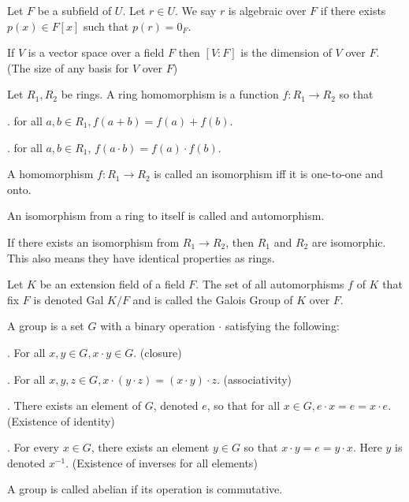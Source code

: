 \documentclass{article}
\newcommand\inv{^{-1}}
\begin{document}
Let $F$ be a subfield of $U$. Let $r\in U$. We say $r$ is algebraic over $F$ if there exists $p(x)\in F[x]$ such that $p(r)=0_F$.

\noindent{\bf $[V:F]$}

If $V$ is a vector space over a field $F$ then $[V:F]$ is the dimension of $V$ over $F$. (The size of any basis for $V$ over $F$)


Let $R_1, R_2$ be rings. A ring homomorphism is a function $f:R_1\to R_2$ so that

\indent{}. for all $a,b\in R_1, f(a+b)=f(a)+f(b)$.

\indent{}. for all $a,b\in R_1$, $f(a\cdot b) = f(a)\cdot f(b)$.


A homomorphism $f:R_1 \to R_2$ is called an isomorphism iff it is one-to-one and onto.


An isomorphism from a ring to itself is called and automorphism.


If there exists an isomorphism from $R_1\to R_2$, then $R_1$ and $R_2$ are isomorphic. This also means they have identical properties as rings.


Let $K$ be an extension field of a field $F$. The set of all automorphisms $f$ of $K$ that fix $F$ is denoted Gal $K/F$ and is called the Galois Group of $K$ over $F$.


A group is a set $G$ with a binary operation $\cdot$ satisfying the following:

\indent{}. For all $x,y\in G, x\cdot y\in G$. (closure)

\indent{}. For all $x,y,z\in G, x\cdot (y\cdot z) = (x \cdot y)\cdot z$. (associativity)

\indent{}. There exists an element of $G$, denoted $e$, so that for all $x\in G,e\cdot x = e = x \cdot e$. (Existence of identity)

\indent{}. For every $x\in G$, there exists an element $y \in G$ so that $x\cdot y = e = y\cdot x$. Here $y$ is denoted $x\inv$. (Existence of inverses for all elements)


A group is called abelian if its operation is commutative.
\end{document}
